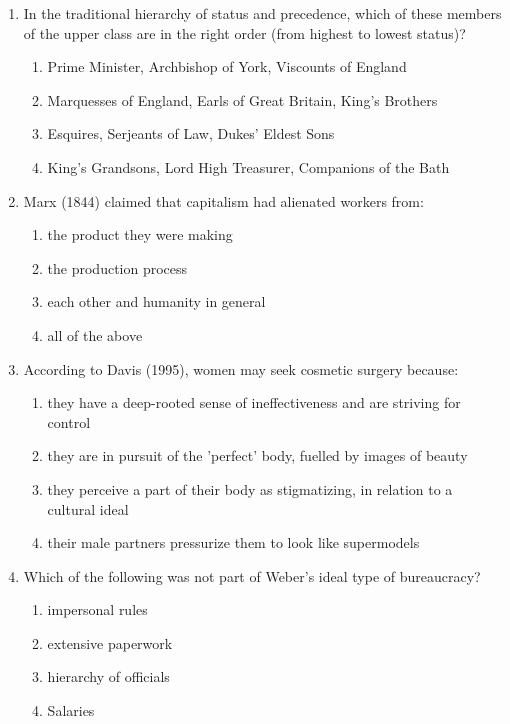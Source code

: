 \documentclass[12pt]{article}
\begin{document}
\begin{enumerate}[label=\arabic*.]
\begin{enumerate}[label=(\alph*)]
\end{enumerate}
\item In the traditional hierarchy of status and precedence, which of these members of the upper class are in the right order (from highest to lowest status)?
\begin{enumerate}[label=(\alph*)]
    \item Prime Minister, Archbishop of York, Viscounts of England
    \item Marquesses of England, Earls of Great Britain, King's Brothers
    \item Esquires, Serjeants of Law, Dukes' Eldest Sons
    \item King's Grandsons, Lord High Treasurer, Companions of the Bath
\end{enumerate}
\item Marx (1844) claimed that capitalism had alienated workers from:
\begin{enumerate}[label=(\alph*)]
    \item the product they were making
    \item the production process
    \item each other and humanity in general
    \item all of the above
\end{enumerate}
\item According to Davis (1995), women may seek cosmetic surgery because:
\begin{enumerate}[label=(\alph*)]
    \item they have a deep-rooted sense of ineffectiveness and are striving for control
    \item they are in pursuit of the 'perfect' body, fuelled by images of beauty
    \item they perceive a part of their body as stigmatizing, in relation to a cultural ideal
    \item their male partners pressurize them to look like supermodels
\end{enumerate}
\item Which of the following was not part of Weber's ideal type of bureaucracy?
\begin{enumerate}[label=(\alph*)]
    \item impersonal rules
    \item extensive paperwork
    \item hierarchy of officials
    \item Salaries
\end{enumerate}

\end{enumerate}
\end{document}
